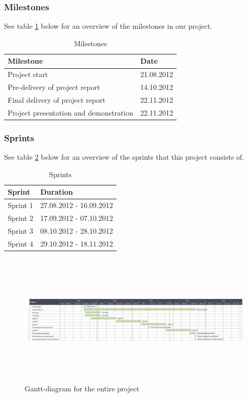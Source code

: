 \subsubsection*{Milestones}
See table \ref{tab:milestones} below for an overview of the milestones in our project.
\begin{table}[h!]
\begin{center}
\begin{tabular}{l|l} \hline
\textbf{Milestone} & \textbf{Date} \\ \hline \hline
Project start &  21.08.2012\\ 
Pre-delivery of project report & 14.10.2012\\ 
Final delivery of project report & 22.11.2012\\
Project presentation and demonstration & 22.11.2012\\ \hline
\end{tabular}
\end{center}
\caption{Milestones} \label{tab:milestones}
\end{table}

\subsubsection*{Sprints}
See table \ref{tab:sprints} below for an overview of the sprints that this project consists of.
\begin{table}[h!]
\begin{center}
\begin{tabular}{l|l} \hline
\textbf{Sprint} & \textbf{Duration} \\ \hline \hline
Sprint 1 &  27.08.2012 - 16.09.2012\\
Sprint 2 & 17.09.2012 - 07.10.2012\\
Sprint 3 & 08.10.2012 - 28.10.2012\\
Sprint 4 & 29.10.2012 - 18.11.2012\\ \hline
\end{tabular}
\end{center}
\caption{Sprints} \label{tab:sprints}
\end{table}

\begin{figure}[htb]
\begin{center}
\includegraphics[width=\textwidth, height=2.5in]{foo}
\caption{Gantt-diagram for the entire project}
\end{center}
\end{figure}